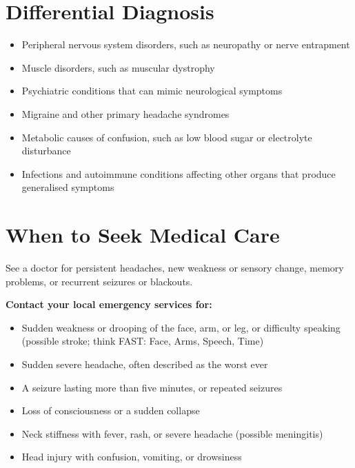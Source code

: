 \section*{Differential Diagnosis}
\begin{itemize}
    \item Peripheral nervous system disorders, such as neuropathy or nerve entrapment
    \item Muscle disorders, such as muscular dystrophy
    \item Psychiatric conditions that can mimic neurological symptoms
    \item Migraine and other primary headache syndromes
    \item Metabolic causes of confusion, such as low blood sugar or electrolyte disturbance
    \item Infections and autoimmune conditions affecting other organs that produce generalised symptoms
\end{itemize}

\section*{When to Seek Medical Care}
See a doctor for persistent headaches, new weakness or sensory change, memory problems, or recurrent seizures or blackouts.

\textbf{Contact your local emergency services for:}
\begin{itemize}
    \item Sudden weakness or drooping of the face, arm, or leg, or difficulty speaking (possible stroke; think FAST: Face, Arms, Speech, Time)
    \item Sudden severe headache, often described as the worst ever
    \item A seizure lasting more than five minutes, or repeated seizures
    \item Loss of consciousness or a sudden collapse
    \item Neck stiffness with fever, rash, or severe headache (possible meningitis)
    \item Head injury with confusion, vomiting, or drowsiness
\end{itemize}

